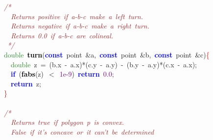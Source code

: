 
{\ttfamily \raggedright {
\noindent
\mbox{}\textit{\textcolor{Brown}{/*}} \\
\mbox{}\textit{\textcolor{Brown}{\ \ Returns\ positive\ if\ a-b-c\ make\ a\ left\ turn.}} \\
\mbox{}\textit{\textcolor{Brown}{\ \ Returns\ negative\ if\ a-b-c\ make\ a\ right\ turn.}} \\
\mbox{}\textit{\textcolor{Brown}{\ \ Returns\ 0.0\ if\ a-b-c\ are\ colineal.}} \\
\mbox{}\textit{\textcolor{Brown}{\ */}} \\
\mbox{}\textcolor{ForestGreen}{double}\ \textbf{\textcolor{Black}{turn}}\textcolor{BrickRed}{(}\textbf{\textcolor{Blue}{const}}\ point\ \textcolor{BrickRed}{\&}a\textcolor{BrickRed}{,}\ \textbf{\textcolor{Blue}{const}}\ point\ \textcolor{BrickRed}{\&}b\textcolor{BrickRed}{,}\ \textbf{\textcolor{Blue}{const}}\ point\ \textcolor{BrickRed}{\&}c\textcolor{BrickRed}{)}\textcolor{Red}{\{} \\
\mbox{}\ \ \textcolor{ForestGreen}{double}\ z\ \textcolor{BrickRed}{=}\ \textcolor{BrickRed}{(}b\textcolor{BrickRed}{.}x\ \textcolor{BrickRed}{-}\ a\textcolor{BrickRed}{.}x\textcolor{BrickRed}{)*(}c\textcolor{BrickRed}{.}y\ \textcolor{BrickRed}{-}\ a\textcolor{BrickRed}{.}y\textcolor{BrickRed}{)}\ \textcolor{BrickRed}{-}\ \textcolor{BrickRed}{(}b\textcolor{BrickRed}{.}y\ \textcolor{BrickRed}{-}\ a\textcolor{BrickRed}{.}y\textcolor{BrickRed}{)*(}c\textcolor{BrickRed}{.}x\ \textcolor{BrickRed}{-}\ a\textcolor{BrickRed}{.}x\textcolor{BrickRed}{);} \\
\mbox{}\ \ \textbf{\textcolor{Blue}{if}}\ \textcolor{BrickRed}{(}\textbf{\textcolor{Black}{fabs}}\textcolor{BrickRed}{(}z\textcolor{BrickRed}{)}\ \textcolor{BrickRed}{$<$}\ \textcolor{Purple}{1e-9}\textcolor{BrickRed}{)}\ \textbf{\textcolor{Blue}{return}}\ \textcolor{Purple}{0.0}\textcolor{BrickRed}{;} \\
\mbox{}\ \ \textbf{\textcolor{Blue}{return}}\ z\textcolor{BrickRed}{;} \\
\mbox{}\textcolor{Red}{\}} \\
\mbox{} \\
\mbox{}\textit{\textcolor{Brown}{/*}} \\
\mbox{}\textit{\textcolor{Brown}{\ \ Returns\ true\ if\ polygon\ p\ is\ convex.}} \\
\mbox{}\textit{\textcolor{Brown}{\ \ False\ if\ it's\ concave\ or\ it\ can't\ be\ determined}} \\
}}
